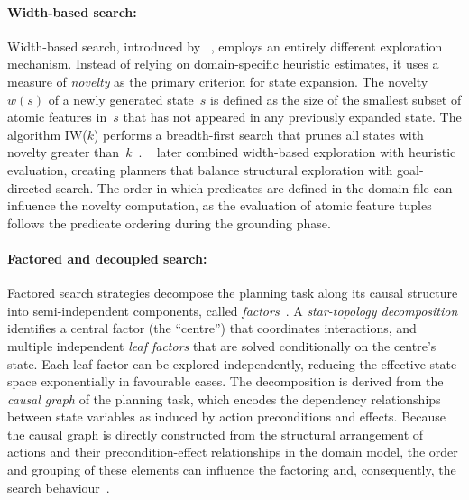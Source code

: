 \paragraph{Width-based search:}
Width-based search, introduced by \citeauthor{LipovetzkyGeffner2012}~\cite{LipovetzkyGeffner2012}, employs an entirely different exploration mechanism.
Instead of relying on domain-specific heuristic estimates, it uses a measure of \emph{novelty} as the primary criterion for state expansion.
The novelty $w(s)$ of a newly generated state~$s$ is defined as the size of the smallest subset of atomic features in~$s$ that has not appeared in any previously expanded state.
The algorithm IW($k$) performs a breadth-first search that prunes all states with novelty greater than~$k$~\cite{LipovetzkyGeffner2012}.
\citeauthor{LipovetzkyGeffner2017}~\cite{LipovetzkyGeffner2017} later combined width-based exploration with heuristic evaluation, creating planners that balance structural exploration with goal-directed search.
The order in which predicates are defined in the domain file can influence the novelty computation, as the evaluation of atomic feature tuples follows the predicate ordering during the grounding phase.

\paragraph{Factored and decoupled search:}
Factored search strategies decompose the planning task along its causal structure into semi-independent components, called \emph{factors}~\cite{GnadHoffmann2018}.
A \emph{star-topology decomposition} identifies a central factor (the \enquote{centre}) that coordinates interactions, and multiple independent \emph{leaf factors} that are solved conditionally on the centre's state.
Each leaf factor can be explored independently, reducing the effective state space exponentially in favourable cases.
The decomposition is derived from the \emph{causal graph} of the planning task, which encodes the dependency relationships between state variables as induced by action preconditions and effects.
Because the causal graph is directly constructed from the structural arrangement of actions and their precondition-effect relationships in the domain model, the order and grouping of these elements can influence the factoring and, consequently, the search behaviour~\cite{GnadHoffmann2018}.

